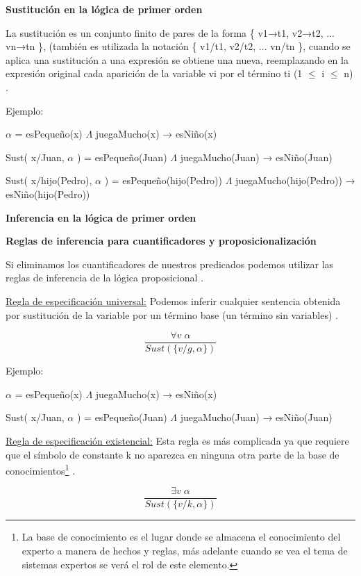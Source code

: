 \documentclass[11pt,fleqn]{book} %
\begin{document}
\textbf{Sustitución en la lógica de primer orden}

La sustitución es un conjunto finito de pares de la forma \{ v1→t1, v2→t2, ... vn→tn \}, (también es utilizada la notación \{ v1/t1, v2/t2, ... vn/tn \}, cuando se aplica una sustitución a una expresión se obtiene una nueva, reemplazando en la expresión original cada aparición de la variable vi por el término ti (1 $\leq$ i $\leq$ n) \cite{navarro_prolog}.

Ejemplo:

$\alpha$ = esPequeño(x) $\Lambda$ juegaMucho(x) → esNiño(x)

Sust( {x/Juan}, $\alpha$ ) = esPequeño(Juan)  $\Lambda$ juegaMucho(Juan) → esNiño(Juan)

Sust( {x/hijo(Pedro)}, $\alpha$ ) 
= esPequeño(hijo(Pedro)) $\Lambda$ juegaMucho(hijo(Pedro)) → esNiño(hijo(Pedro))

\textbf{Inferencia en la lógica de primer orden}

\textbf{Reglas de inferencia para cuantificadores y proposicionalización}

Si eliminamos los cuantificadores de nuestros predicados podemos utilizar las reglas de inferencia de la lógica proposicional \cite{russell2004inteligencia}.

\underline{Regla de especificación universal:} Podemos inferir cualquier sentencia obtenida por sustitución de la variable por un término base (un término sin variables) \cite{russell2004inteligencia}.

\begingroup
\Large
\begin{equation}
\frac{\forall v  \; \alpha}{Sust(\{ v/g,\alpha \})}
\end{equation}
\endgroup

Ejemplo:

$\alpha$ = esPequeño(x) $\Lambda$ juegaMucho(x) → esNiño(x)

Sust( {x/Juan}, $\alpha$ ) = esPequeño(Juan)  $\Lambda$ juegaMucho(Juan) → esNiño(Juan)

\underline{Regla de especificación existencial:} Esta regla es más complicada ya que requiere que el símbolo de constante k no aparezca en ninguna otra parte de la base de conocimientos\footnote{ La base de conocimiento es el lugar donde se almacena el conocimiento del experto a manera de hechos y reglas, más adelante cuando se vea el tema de sistemas expertos se verá el rol de este elemento.} \cite{russell2004inteligencia}.

\begingroup
\Large
\begin{equation}
\frac{\exists v  \; \alpha}{Sust(\{ v/k,\alpha \})}
\end{equation}
\endgroup
\end{document}
